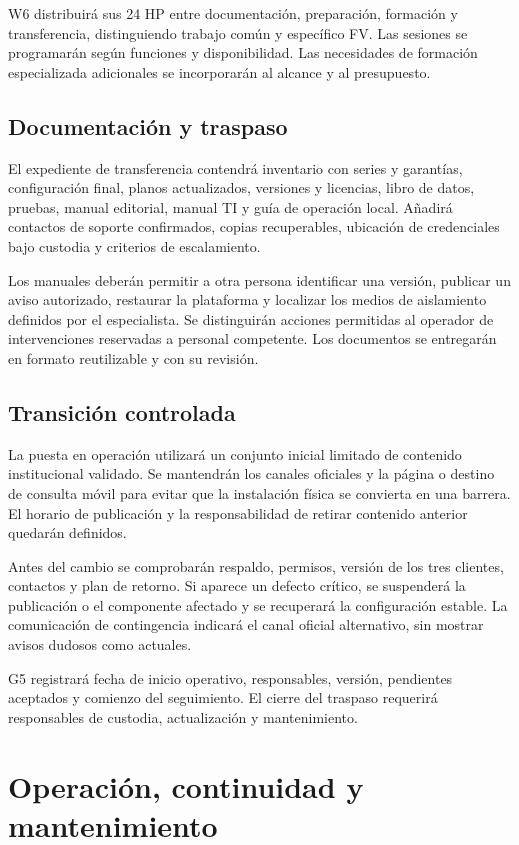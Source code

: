 W6 distribuirá sus 24 HP entre documentación, preparación, formación y transferencia, distinguiendo trabajo común y específico FV. Las sesiones se programarán según funciones y disponibilidad. Las necesidades de formación especializada adicionales se incorporarán al alcance y al presupuesto.

\subsection{Documentación y traspaso}
El expediente de transferencia contendrá inventario con series y garantías, configuración final, planos actualizados, versiones y licencias, libro de datos, pruebas, manual editorial, manual TI y guía de operación local. Añadirá contactos de soporte confirmados, copias recuperables, ubicación de credenciales bajo custodia y criterios de escalamiento.

Los manuales deberán permitir a otra persona identificar una versión, publicar un aviso autorizado, restaurar la plataforma y localizar los medios de aislamiento definidos por el especialista. Se distinguirán acciones permitidas al operador de intervenciones reservadas a personal competente. Los documentos se entregarán en formato reutilizable y con su revisión.

\subsection{Transición controlada}
La puesta en operación utilizará un conjunto inicial limitado de contenido institucional validado. Se mantendrán los canales oficiales y la página o destino de consulta móvil para evitar que la instalación física se convierta en una barrera. El horario de publicación y la responsabilidad de retirar contenido anterior quedarán definidos.

Antes del cambio se comprobarán respaldo, permisos, versión de los tres clientes, contactos y plan de retorno. Si aparece un defecto crítico, se suspenderá la publicación o el componente afectado y se recuperará la configuración estable. La comunicación de contingencia indicará el canal oficial alternativo, sin mostrar avisos dudosos como actuales.

G5 registrará fecha de inicio operativo, responsables, versión, pendientes aceptados y comienzo del seguimiento. El cierre del traspaso requerirá responsables de custodia, actualización y mantenimiento.

\section{Operación, continuidad y mantenimiento}
\label{sec:int_operacion}
